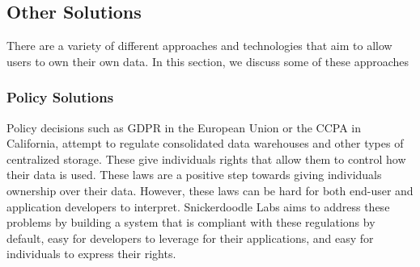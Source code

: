 
\subsection{Other Solutions}

There are a variety of different approaches and technologies that aim to allow users to own their own data. In this section, we discuss some of these approaches

\subsubsection{Policy Solutions}
Policy decisions such as GDPR in the European Union or the CCPA in California, attempt to regulate consolidated data warehouses and other types of centralized storage. 
These give individuals rights that allow them to control how their data is used. These laws are a positive step towards giving individuals ownership over their data. 
However, these laws can be hard for both end-user and application developers to interpret. Snickerdoodle Labs aims to address these problems by 
building a system that is compliant with these regulations by default, easy for developers to leverage for their applications, and easy for individuals to express 
their rights.


